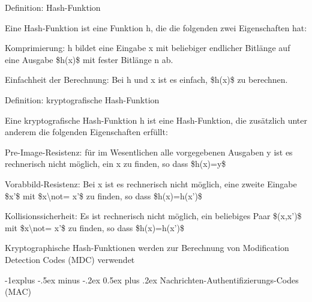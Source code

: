 \documentclass[a4paper]{article}
\makeatletter
\renewcommand{\subsection}{\@startsection{subsection}{2}{0mm}%
 {-1explus -.5ex minus -.2ex}%
 {0.5ex plus .2ex}%
 {\normalfont\normalsize\bfseries}}
\makeatother
\begin{document}
\begin{multicols}{3}
      \begin{itemize*}
            \item Definition: Hash-Funktion
            \begin{itemize*}
                  \item Eine Hash-Funktion ist eine Funktion h, die die folgenden zwei Eigenschaften hat:
                  \begin{itemize*} \item Komprimierung: h bildet eine Eingabe x mit beliebiger endlicher Bitlänge auf eine Ausgabe \$h(x)\$ mit fester Bitlänge n ab. \item Einfachheit der Berechnung: Bei h und x ist es einfach, \$h(x)\$ zu berechnen. \end{itemize*}
            \end{itemize*}
            \item Definition: kryptografische Hash-Funktion
            \begin{itemize*}
                  \item Eine kryptografische Hash-Funktion h ist eine Hash-Funktion, die zusätzlich unter anderem die folgenden Eigenschaften erfüllt:
                  \begin{itemize*} \item Pre-Image-Resistenz: für im Wesentlichen alle vorgegebenen Ausgaben y ist es rechnerisch nicht möglich, ein x zu finden, so dass \$h(x)=y\$ \item \begin{enumerate*} \def\labelenumi{\arabic{enumi}.} \setcounter{enumi}{1} \item Vorabbild-Resistenz: Bei x ist es rechnerisch nicht möglich, eine zweite Eingabe \$x'\$ mit \$x\textbackslash not= x'\$ zu finden, so dass \$h(x)=h(x')\$ \end{enumerate*} \item Kollisionssicherheit: Es ist rechnerisch nicht möglich, ein beliebiges Paar \$(x,x')\$ mit \$x\textbackslash not= x'\$ zu finden, so dass \$h(x)=h(x')\$ \end{itemize*}
                  \item Kryptographische Hash-Funktionen werden zur Berechnung von Modification Detection Codes (MDC) verwendet
            \end{itemize*}
      \end{itemize*}


      \subsection{Nachrichten-Authentifizierungs-Codes
            (MAC)}


\end{multicols}
\end{document}
